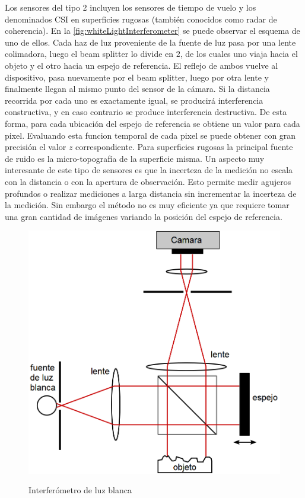 Los sensores del tipo 2 incluyen los sensores de tiempo de vuelo y los denominados \ac{CSI} en superficies rugosas (también conocidos como radar de coherencia). 
En la \autoref{fig:whiteLightInterferometer} se puede observar el esquema de uno de ellos. Cada haz de luz proveniente de la fuente de luz pasa por una lente colimadora, luego el beam splitter lo divide en $2$, de los cuales uno viaja hacia el objeto y el otro hacia un espejo de referencia. El reflejo de ambos vuelve al dispositivo, pasa nuevamente por el beam splitter, luego por otra lente y finalmente llegan al mismo punto del sensor de la cámara. Si la distancia recorrida por cada uno es exactamente igual, se producirá interferencia constructiva, y en caso contrario se produce interferencia destructiva. De esta forma, para cada ubicación del espejo de referencia se obtiene un valor para cada pixel. Evaluando esta funcion temporal de cada pixel se puede obtener con gran precisión el valor $z$ correspondiente.
Para superficies rugosas la principal fuente de ruido es la micro-topografía de la superficie misma. Un aspecto muy interesante de este tipo de sensores es que la incerteza de la medición no escala con la distancia o con la apertura de observación. Esto permite medir agujeros profundos o realizar mediciones a larga distancia sin incrementar la incerteza de la medición. Sin embargo el método no es muy eficiente ya que requiere tomar una gran cantidad de imágenes variando la posición del espejo de referencia. 

\begin{figure}[bth]
    \myfloatalign
        {\includegraphics[width=0.8\linewidth]{images/whiteLightInterferometer}}
        \caption{Interferómetro de luz blanca}
        \label{fig:whiteLightInterferometer}
\end{figure}

